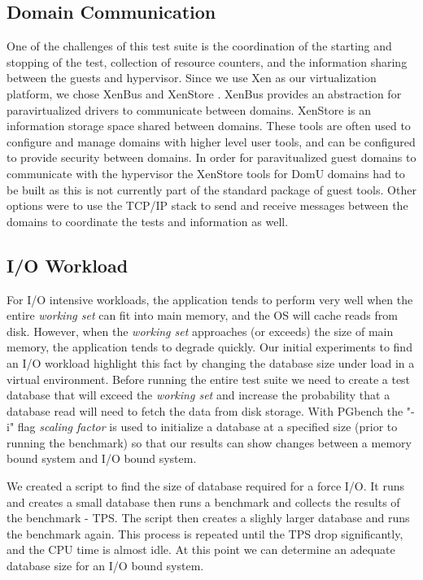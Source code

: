 \subsection{Domain Communication}
One of the challenges of this test suite is the coordination of the starting and stopping of the test, collection of resource counters, and the information sharing between the guests and hypervisor.  
Since we use Xen as our virtualization platform, we chose XenBus and XenStore \cite{xenbus}. 
XenBus provides an abstraction for paravirtualized drivers to communicate between domains.  
XenStore is an information storage space shared between domains.  
These tools are often used to configure and manage domains with higher level user tools, and can be configured to provide security between domains.
In order for paravitualized guest domains to communicate with the hypervisor the XenStore tools for DomU domains had to be built as this is not currently part of the standard package of guest tools.  Other options were to use the TCP/IP stack to send and receive messages between the domains to coordinate the tests and information as well.

\subsection{I/O Workload}
For I/O intensive workloads, the application tends to perform very well when the entire \emph{working set} can fit into main memory, and the OS will cache reads from disk.
However, when the \emph{working set}  approaches (or exceeds) the size of main memory, the application tends to degrade quickly.  
Our initial experiments to find an I/O workload highlight this fact by changing the database size under load in a virtual environment.
Before running the entire test suite we need to create a test database that will exceed the \emph{working set} and increase the probability that a database read will need to fetch the data from disk storage.  With PGbench the "-i" flag \emph{scaling factor} is used to initialize a database at a specified size (prior to running the benchmark) so that our results can show changes between a memory bound system and I/O bound system.  

We created a script to find the size of database required for a force I/O.  It runs and creates a small database then runs a benchmark and collects the results of the benchmark - TPS.  The script then creates a slighly larger database and runs the benchmark again.  This process is repeated until the TPS drop significantly, and the CPU time is almost idle.  At this point we can determine an adequate database size for an I/O bound system.


